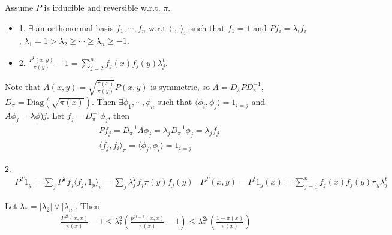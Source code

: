 \documentclass[12pt,a4paper]{article}
\newenvironment{proof}
{\begin{changemargin}{1cm}{0.5cm} 
	}%
	{\end{changemargin}
}
\renewenvironment{i}
{\begin{itemize} 
	}%
	{\end{itemize}
}
\begin{document}
 Assume $P$ is irducible and reversible w.r.t. $\pi$.
\begin{i}
\item[1.] $\exists$ an orthonormal basis $f_1, \cdots, f_n$ w.r.t $\langle \cdot, \cdot \rangle_{\pi}$ such that $f_1 =1$ and $Pf_i =\lambda_i f_i$, $\lambda_1 =1 > \lambda_2 \geq \cdots \geq \lambda_n \geq -1$.
\item[2.] $\frac{P^t(x,y)}{\pi(y)} - 1 =\sum_{j=2}^n f_j(x) f_j(y)\lambda_j^t$.
\end{i}
\begin{proof}
\pf Note that $A(x,y)  =\sqrt{\frac{\pi(x)}{\pi(y)}} P(x,y)$ is symmetric, so $A = D_{\pi} P D_{\pi}^{-1}$, $D_{\pi} = \text{Diag}(\sqrt{\pi(x)})$. Then $\exists \phi_1, \cdots, \phi_n$ such that $\langle \phi_i, \phi_j \rangle = 1_{i=j}$ and $A\phi_j = \lambda \phi)j$. Let $f_j = D^{-1}_{\pi} \phi_j$, then
\begin{align*}
&Pf_j = D_{\pi}^{-1} A \phi_j = \lambda_j D_{\pi}^{-1} \phi_j = \lambda_j f_j \\
&\langle f_j, f_i\rangle_{\pi} = \langle \phi_j, \phi_i \rangle = 1_{i=j}
\end{align*}

2. 
\begin{align*}
&P^T 1_y = \sum_j P^T f_j \langle f_j, 1_y\rangle_{\pi} = \sum_j \lambda_j^T f_j \pi(y)f_j(y)
& P^T(x,y) = P^t 1_y(x) = \sum_{j=1}^n f_j(x)f_j(y) \pi_y\lambda_j^t
\end{align*}
\end{proof}
\s

\corr Let $\lambda_* = |\lambda_2| \vee |\lambda_n|$. Then
\begin{align*}
\frac{P^{2t}(x,x)}{\pi(x)} -1 \leq \lambda_*^2 (\frac{p^{2t-2}(x,x)}{\pi(x)}-1)\leq \lambda_*^{2t}(\frac{1-\pi(x)}{\pi(x)})
\end{align*}
\end{document}
